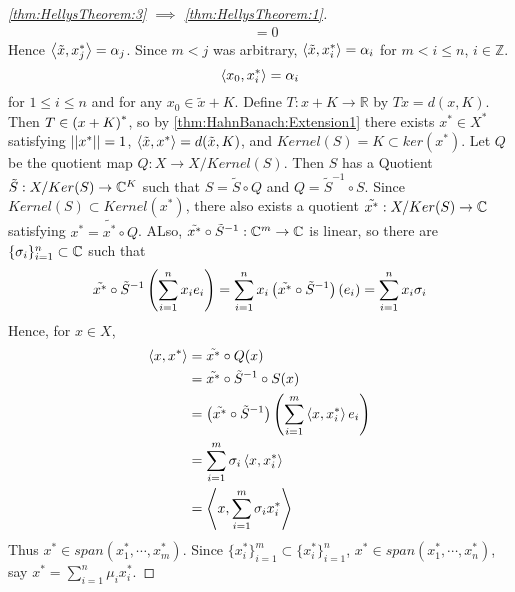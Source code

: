 \begin{thm}
\begin{proof}[\ref{thm:HellysTheorem:3} $\implies$ \ref{thm:HellysTheorem:1}]
\begin{align*}
        & = 0
        \end{align*}
        Hence $\left\langle \tilde{x}, x_j^* \right\rangle = \alpha_j$. 
        Since $m < j$ was arbitrary, 
        $\left\langle \tilde{x}, x_i^* \right\rangle = \alpha_i$ for 
        $m < i \leq n$, $i \in \mathbb{Z}$. 
        \begin{equation*}
        \label{eq:HellysTheorem:2}
        \left\langle x_0, x_i^* \right\rangle = \alpha_i 
        \end{equation*}
        for $1 \leq i \leq n$
        and for any $x_0 \in \tilde{x}+K$. 
        Define $T:x+K \to \mathbb{R}$ by 
        $Tx=d(x, K)$. 
        Then $T \in \left( x+K\right)^*$, so by 
        \ref{thm:HahnBanach:Extension1}
        there exists $x^* \in X^*$ satisfying
        $\left|\left| x^* \right|\right|=1$, 
        $\left\langle \tilde{x}, x^* \right\rangle = d(\tilde{x}, K)$, 
        and $Kernel(S) = K \subset ker(x^*)$. 
        Let $Q$ be the quotient map $Q:X \to X/Kernel(S)$. 
        Then $S$ has a Quotient $\tilde{S}:X/Ker(S) \to \mathbb{C}^K$ such that 
        $S = \tilde{S} \circ Q$ and $Q = \tilde{S}^{-1} \circ S$. 
        Since $Kernel(S) \subset Kernel(x^*)$, there also exists a 
        quotient $\tilde{x^*}:X/Ker(S) \to \mathbb{C}$
        satisfying $x^* = \tilde{x^*} \circ Q$. 
        ALso, $\tilde{x^*} \circ \tilde{S}^{-1}:\mathbb{C}^m \to \mathbb{C}$ is linear, so 
        there are $\{\sigma_i\}_{i=1}^n \subset \mathbb{C}$ such that 
        \begin{equation*}
            \tilde{x^*} \circ \tilde{S}^{-1}\left( \sum_{i=1}^n x_i e_i\right) 
            = \sum\limits_{i=1}^n x_i \left( \tilde{x^*} \circ \tilde{S}^{-1}\right)(e_i) 
            = \sum\limits_{i=1}^n x_i \sigma_i
        \end{equation*}
        Hence, for $x \in X$, 
        \begin{align}
        \left\langle x, x^* \right\rangle & = \tilde{x^*} \circ Q (x)\\
        & = \tilde{x^*} \circ \tilde{S}^{-1} \circ S(x) \\
        & = \left(  \tilde{x^*} \circ \tilde{S}^{-1}\right) \left(  \sum\limits_{i=1}^m \left\langle x, x_i^* \right\rangle e_i\right) \\
        & = \sum\limits_{i=1}^m \sigma_i\left\langle x, x_i^* \right\rangle \\
        & = \left\langle x, \sum\limits_{i=1}^m \sigma_i x_i^* \right\rangle
        \end{align}
        Thus $x^* \in span(x_1^*, \cdots, x_m^*)$. 
        Since $\{x_i^*\}_{i=1}^m \subset \{x_i^*\}_{i=1}^n$, 
        $x^* \in span(x_1^*, \cdots, x_n^*)$, say $x^* = \sum\limits_{i=1}^n \mu_i x_i^*$. 

\end{proof}
\end{thm}
